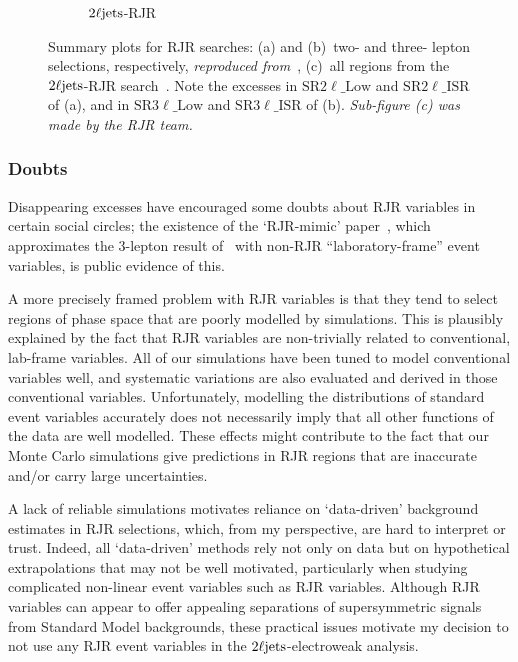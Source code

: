 \begin{figure}[tp]
\begin{subfigure}{0.9\textwidth}
\caption{$2\ell\mathrm{jets}$-RJR~\cite{atlas2022searches}}
\label{fig:2ljets_rjr_summaries_2ljets}
\end{subfigure}
\caption[
Summary plots for RJR searches
]{%
Summary plots for RJR searches:
(a) and (b)~two- and three- lepton selections, respectively,
\emph{reproduced from}~\cite{atlas_rjr_23l_SUSY_2017_03},
(c)~all regions from the $2\ell\mathrm{jets}$-RJR search~\cite{atlas2022searches}.
Note the excesses in
$\mathrm{SR}2\ell\_\mathrm{Low}$ and $\mathrm{SR}2\ell\_\mathrm{ISR}$ of (a),
and in
$\mathrm{SR}3\ell\_\mathrm{Low}$ and $\mathrm{SR}3\ell\_\mathrm{ISR}$ of (b).
\emph{Sub-figure (c) was made by the RJR team.}
}
\label{fig:2ljets_rjr_summaries}
\end{figure}


\subsubsection{Doubts}
Disappearing excesses have encouraged some doubts about RJR variables in
certain social circles;
the existence of the `RJR-mimic' paper~\cite{atlas_rjr_mimic_SUSY_2018_06},
which approximates the $3$-lepton result of~\cite{atlas_rjr_23l_SUSY_2017_03}
with non-RJR ``laboratory-frame'' event variables,
is public evidence of this.

A more precisely framed problem with RJR variables is that they tend to select
regions of phase space that are poorly modelled by simulations.
This is plausibly explained by the fact that RJR variables are non-trivially
related to conventional, lab-frame variables.
All of our simulations have been tuned to model conventional variables well,
and systematic variations are also evaluated and derived in those conventional
variables.
Unfortunately, modelling the distributions of standard event variables
accurately does not necessarily imply that all other functions of the data are
well modelled.
These effects might contribute to the fact that our Monte Carlo simulations
give predictions in RJR regions that are inaccurate and/or carry large
uncertainties.

A lack of reliable simulations motivates reliance on `data-driven' background
estimates in RJR selections, which, from my perspective, are hard to interpret
or trust.
Indeed,  all `data-driven' methods rely not only on data but on
hypothetical extrapolations that may not be well motivated, particularly when
studying complicated non-linear event variables such as RJR variables.
Although RJR variables can appear to offer appealing separations of
supersymmetric signals from Standard Model backgrounds, these practical issues
motivate my decision to not use any RJR event variables in the
$2\ell\mathrm{jets}$-electroweak analysis.


